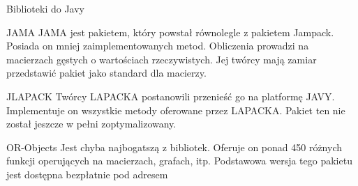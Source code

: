 	\begin{frame}[allowframebreaks]{Biblioteki do Javy}
		\begin{block}{JAMA}
			JAMA jest pakietem, który powstał równolegle z pakietem Jampack. Posiada on mniej zaimplementowanych metod. Obliczenia prowadzi na macierzach gęstych o wartościach rzeczywistych. Jej twórcy mają zamiar przedstawić pakiet jako standard dla macierzy. 
			
		\end{block}
		\begin{block}{JLAPACK}
			Twórcy LAPACKA postanowili przenieść go na platformę JAVY. Implementuje on wszystkie metody oferowane przez LAPACKA. Pakiet ten nie został jeszcze w pełni zoptymalizowany. 
			
		\end{block}
		\begin{block}{OR-Objects}
			Jest chyba najbogatszą z bibliotek. Oferuje on ponad 450 różnych funkcji operujących na macierzach, grafach, itp. Podstawowa wersja tego pakietu jest dostępna bezpłatnie pod adresem
			
		\end{block}
	\end{frame}